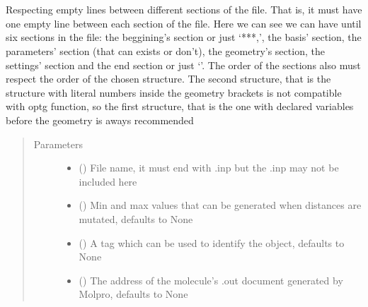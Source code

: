 \documentclass[letterpaper,10pt,english]{sphinxmanual}
\begin{document}
\begin{fulllineitems}
\begin{fulllineitems}
 \\
 \\Respecting empty lines between different sections of the file. That is, it must have one empty line between
each section of the file. Here we can see we can have until six sections in the file: the beggining’s section or
just ‘***,’, the basis’ section, the parameters’ section (that can exists or don’t), the geometry’s section, 
the settings’ section and the end section or just ‘\sphinxhyphen{}\sphinxhyphen{}\sphinxhyphen{}’. The order of the sections also must respect the
order of the chosen structure. The second structure, that is the structure with literal numbers inside the
geometry brackets is not compatible with optg function, so the first structure, that is the one with declared
variables before the geometry is aways recommended
\begin{quote}\begin{description}
\item[{Parameters}] \leavevmode\begin{itemize}
\item {} 
\sphinxAtStartPar
{} () \textendash{} File name, it must end with .inp but the .inp may not be included here

\item {} 
\sphinxAtStartPar
{} (\sphinxstyleliteralemphasis{\sphinxupquote{{[}}}\sphinxstyleliteralemphasis{\sphinxupquote{, }}\sphinxstyleliteralemphasis{\sphinxupquote{{]}}}\sphinxstyleliteralemphasis{\sphinxupquote{, }}) \textendash{} Min and max values that can be generated when distances are mutated, defaults to None

\item {} 
\sphinxAtStartPar
{} (\sphinxstyleliteralemphasis{\sphinxupquote{, }}) \textendash{} A tag which can be used to identify the object, defaults to None

\item {} 
\sphinxAtStartPar
{} (\sphinxstyleliteralemphasis{\sphinxupquote{, }}) \textendash{} The address of the molecule’s .out document generated by Molpro, defaults to None


\end{itemize}
\end{description}
\end{quote}
\end{fulllineitems}
\end{fulllineitems}
\end{document}
